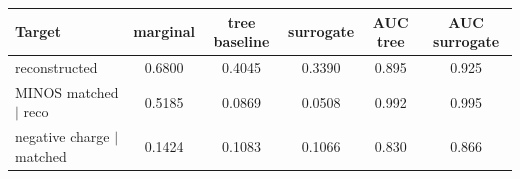 \begin{tabular}{lccccc}
\toprule
Target & marginal & tree baseline & surrogate & AUC tree & AUC surrogate \\
\midrule
reconstructed & 0.6800 & 0.4045 & 0.3390 & 0.895 & 0.925 \\
MINOS matched $\mid$ reco & 0.5185 & 0.0869 & 0.0508 & 0.992 & 0.995 \\
negative charge $\mid$ matched & 0.1424 & 0.1083 & 0.1066 & 0.830 & 0.866 \\
\bottomrule
\end{tabular}
